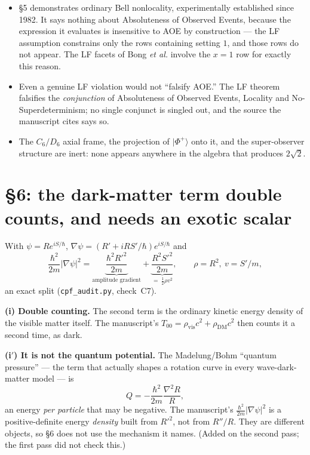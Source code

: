 \documentclass[11pt,a4paper]{article}
\begin{document}
\begin{itemize}[leftmargin=1.2em]
\item \S5 demonstrates ordinary Bell nonlocality, experimentally established since
  1982. It says nothing about Absoluteness of Observed Events, because the
  expression it evaluates is insensitive to AOE by construction --- the LF
  assumption constrains only the rows containing setting $1$, and those rows do not
  appear. The LF facets of Bong \emph{et al.} involve the $x=1$ row for exactly this
  reason.
\item Even a genuine LF violation would not ``falsify AOE.'' The LF theorem
  falsifies the \emph{conjunction} of Absoluteness of Observed Events, Locality and
  No-Superdeterminism; no single conjunct is singled out, and the source the
  manuscript cites says so.
\item The $C_6/D_6$ axial frame, the projection of $|\Phi^+\rangle$ onto it, and the
  super-observer structure are inert: none appears anywhere in the algebra that
  produces $2\sqrt2$.
\end{itemize}

\section{\S6: the dark-matter term double counts, and needs an exotic scalar}
\label{sec:dm}

With $\psi = Re^{iS/\hbar}$, $\nabla\psi = (R' + iRS'/\hbar)e^{iS/\hbar}$ and
\[
\frac{\hbar^2}{2m}|\nabla\psi|^2
= \underbrace{\frac{\hbar^2 R'^2}{2m}}_{\text{amplitude gradient}}
+ \underbrace{\frac{R^2S'^2}{2m}}_{=\ \frac12\rho v^2},
\qquad \rho = R^2,\ v = S'/m,
\]
an exact split (\texttt{cpf\_audit.py}, check~C7).

\textbf{(i) Double counting.} The second term is the ordinary kinetic energy density
of the visible matter itself. The manuscript's
$T_{00} = \rho_{\mathrm{vis}}c^2 + \rho_{\mathrm{DM}}c^2$ then counts it a second
time, as dark.

\textbf{(i$'$) It is not the quantum potential.} The Madelung/Bohm ``quantum
pressure'' --- the term that actually shapes a rotation curve in every wave-dark-matter
model --- is
\[
Q = -\frac{\hbar^2}{2m}\frac{\nabla^2 R}{R},
\]
an energy \emph{per particle} that may be negative. The manuscript's
$\tfrac{\hbar^2}{2m}|\nabla\psi|^2$ is a positive-definite energy \emph{density}
built from $R'^2$, not from $R''/R$. They are different objects, so \S6 does not use
the mechanism it names. (Added on the second pass; the first pass did not check
this.)
\end{document}

